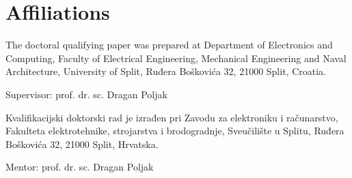 \chapter*{Affiliations}

\noindent
The doctoral qualifying paper was prepared at Department of Electronics and Computing, Faculty of Electrical Engineering, Mechanical Engineering and Naval Architecture, University of Split, Ruđera Boškovića 32, 21000 Split, Croatia.

Supervisor: prof. dr. sc. Dragan Poljak

\vspace{1cm}

\noindent
Kvalifikacijski doktorski rad je izrađen pri Zavodu za elektroniku i računarstvo, Fakulteta elektrotehnike, strojarstva i brodogradnje, Sveučilište u Splitu, Ruđera Boškovića 32, 21000 Split, Hrvatska.

Mentor: prof. dr. sc. Dragan Poljak
